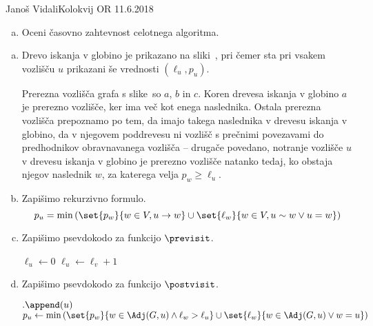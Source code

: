 \begin{naloga}{Janoš Vidali}{Kolokvij OR 11.6.2018}
\begin{vprasanje}
\begin{enumerate}[(a)]
\item Oceni časovno zahtevnost celotnega algoritma.
\end{enumerate}

\begin{slika}
\pgfslika
{}
\end{slika}
\end{vprasanje}

\begin{odgovor}
\begin{enumerate}[(a)]
\item Drevo iskanja v globino je prikazano na sliki~,
pri čemer sta pri vsakem vozlišču $u$ prikazani še vrednosti $(\ell_u, p_u)$.

Prerezna vozlišča grafa s slike~\fig so $a$, $b$ in $c$.
Koren drevesa iskanja v globino $a$ je prerezno vozlišče,
ker ima več kot enega naslednika.
Ostala prerezna vozlišča prepoznamo po tem,
da imajo takega naslednika v drevesu iskanja v globino,
da v njegovem poddrevesu ni vozlišč s prečnimi povezavami
do predhodnikov obravnavanega vozlišča
-- drugače povedano,
notranje vozlišče $u$ v drevesu iskanja v globino
je prerezno vozlišče natanko tedaj,
ko obstaja njegov naslednik $w$,
za katerega velja $p_w \ge \ell_u$.

\item Zapišimo rekurzivno formulo.
$$
p_u = \min\left(\set{p_w}{w \in V, u \to w} \cup \set{\ell_w}{w \in V, u \sim w \lor u = w}\right)
$$

\item Zapišimo psevdokodo za funkcijo $\previsit$.
\begin{small}
\begin{algorithmic}
        \State $\ell_u \gets 0$
    \Else
        \State $\ell_u \gets \ell_v + 1$
    \EndIf
\EndFunction
\end{algorithmic}
\end{small}

\item Zapišimo psevdokodo za funkcijo $\postvisit$.
\begin{small}
\begin{algorithmic}
        $.\append(u)$
    \EndIf
    \State $p_u \gets \min\left(\set{p_w}{w \in \Adj(G, u) \land \ell_w > \ell_u} \cup \set{\ell_w}{w \in \Adj(G, u) \lor w = u}\right)$
\EndFunction
\end{algorithmic}
\end{small}


\end{enumerate}
\end{odgovor}
\end{naloga}
